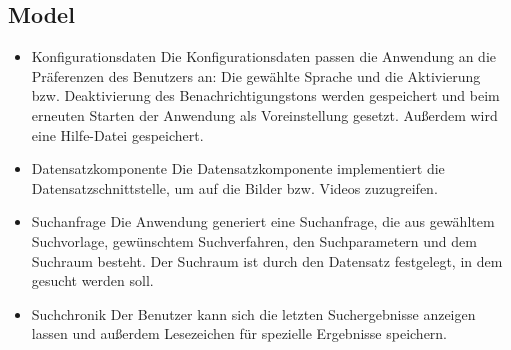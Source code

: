 \subsection{Model}
\begin{itemize}
\item Konfigurationsdaten\newline
Die Konfigurationsdaten passen die Anwendung an die Präferenzen des Benutzers an: Die gewählte Sprache und die Aktivierung bzw. Deaktivierung des Benachrichtigungstons werden gespeichert und beim erneuten Starten der Anwendung als Voreinstellung gesetzt. Außerdem wird eine Hilfe-Datei gespeichert.
\item Datensatzkomponente\newline
Die Datensatzkomponente implementiert die Datensatzschnittstelle, um auf die Bilder bzw. Videos zuzugreifen.
\item Suchanfrage\newline
Die Anwendung generiert eine Suchanfrage, die aus gewähltem Suchvorlage, gewünschtem Suchverfahren, den Suchparametern und dem Suchraum besteht. Der Suchraum ist durch den Datensatz festgelegt, in dem gesucht werden soll.
\item Suchchronik\newline
Der Benutzer kann sich die letzten Suchergebnisse anzeigen lassen und außerdem Lesezeichen für spezielle Ergebnisse speichern.
\end{itemize}

